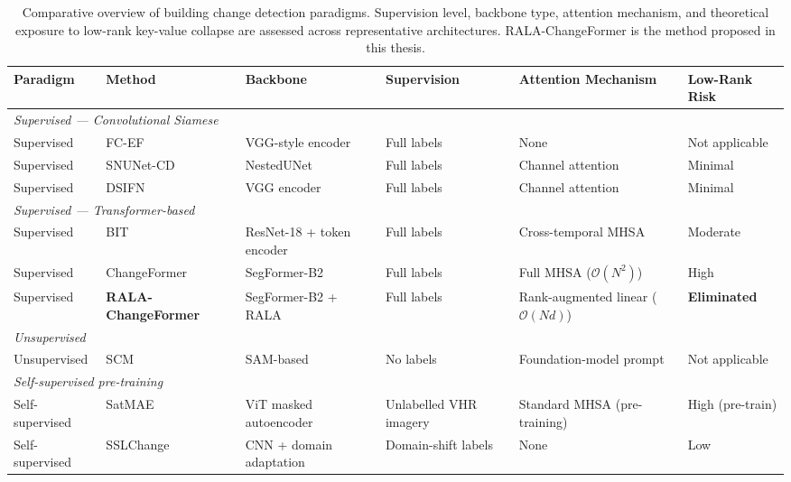 \begin{table}[htbp]
\centering
{\footnotesize
\caption{Comparative overview of building change detection paradigms. Supervision level, backbone type, attention mechanism, and theoretical exposure to low-rank key-value collapse are assessed across representative architectures. RALA-ChangeFormer is the method proposed in this thesis.}
\label{tab:bcd_paradigms}
\begin{tabularx}{\textwidth}{p{2.0cm} >{\raggedright\arraybackslash}X >{\raggedright\arraybackslash}X p{1.6cm} >{\raggedright\arraybackslash}X p{1.7cm}}
\hline
\textbf{Paradigm} & \textbf{Method} & \textbf{Backbone} & \textbf{Supervision} & \textbf{Attention Mechanism} & \textbf{Low-Rank Risk} \\
\hline
\multicolumn{6}{l}{\textit{Supervised --- Convolutional Siamese}} \\[2pt]
Supervised & FC-EF \cite{Daudt2018SiamICIP} & VGG-style encoder & Full labels & None & Not applicable \\
Supervised & SNUNet-CD \cite{Fang2021SNUNetCD} & NestedUNet & Full labels & Channel attention & Minimal \\
Supervised & DSIFN \cite{Zhang2020FusionNetDSIFN} & VGG encoder & Full labels & Channel attention & Minimal \\
\hline
\multicolumn{6}{l}{\textit{Supervised --- Transformer-based}} \\[2pt]
Supervised & BIT \cite{Chen2022BIT} & ResNet-18 + token encoder & Full labels & Cross-temporal MHSA & Moderate \\
Supervised & ChangeFormer \cite{Bandara2022ChangeFormer} & SegFormer-B2 & Full labels & Full MHSA ($\mathcal{O}(N^2)$) & High \\
\rowcolor{pastelorange}
Supervised & \textbf{RALA-ChangeFormer} \cite{Fan2025RALA} & SegFormer-B2 + RALA & Full labels & Rank-augmented linear ($\mathcal{O}(Nd)$) & \textbf{Eliminated} \\
\hline
\multicolumn{6}{l}{\textit{Unsupervised}} \\[2pt]
Unsupervised & SCM \cite{Zhao2023SCM} & SAM-based & No labels & Foundation-model prompt & Not applicable \\
\hline
\multicolumn{6}{l}{\textit{Self-supervised pre-training}} \\[2pt]
Self-supervised & SatMAE \cite{Cong2022SatMAE} & ViT masked autoencoder & Unlabelled VHR imagery & Standard MHSA (pre-training) & High (pre-train) \\
Self-supervised & SSLChange \cite{Zhao2024SSLChange} & CNN + domain adaptation & Domain-shift labels & None & Low \\
\hline
\end{tabularx}
}%
\end{table}
